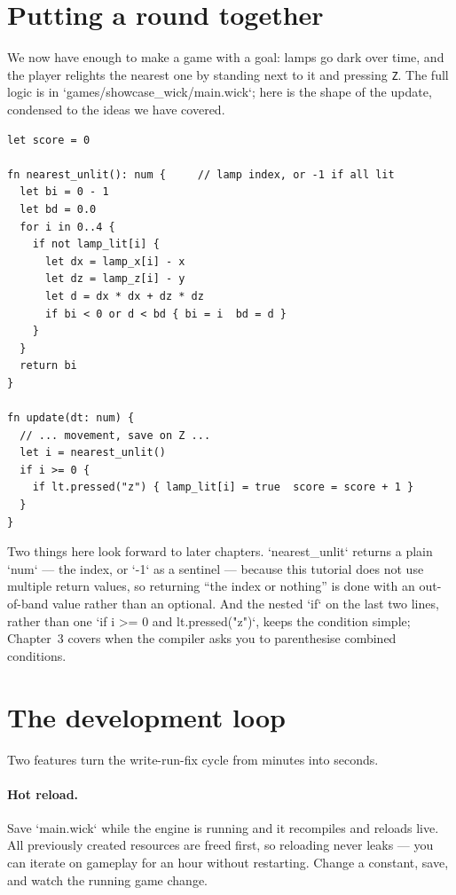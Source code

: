 \section{Putting a round together}

We now have enough to make a game with a goal: lamps go dark over time, and
the player relights the nearest one by standing next to it and pressing
\texttt{Z}. The full logic is in `games/showcase_wick/main.wick`; here is the
shape of the update, condensed to the ideas we have covered.

\begin{lstlisting}[language=wick]
let score = 0

fn nearest_unlit(): num {     // lamp index, or -1 if all lit
  let bi = 0 - 1
  let bd = 0.0
  for i in 0..4 {
    if not lamp_lit[i] {
      let dx = lamp_x[i] - x
      let dz = lamp_z[i] - y
      let d = dx * dx + dz * dz
      if bi < 0 or d < bd { bi = i  bd = d }
    }
  }
  return bi
}

fn update(dt: num) {
  // ... movement, save on Z ...
  let i = nearest_unlit()
  if i >= 0 {
    if lt.pressed("z") { lamp_lit[i] = true  score = score + 1 }
  }
}
\end{lstlisting}

\noindent
Two things here look forward to later chapters. `nearest_unlit` returns a
plain `num` --- the index, or `-1` as a sentinel --- because this tutorial does not use
multiple return values, so returning ``the index or nothing'' is done with an
out-of-band value rather than an optional. And the nested `if` on the last
two lines, rather than one `if i >= 0 and lt.pressed("z")`, keeps the
condition simple; Chapter~3 covers when the compiler asks you to parenthesise
combined conditions.

\section{The development loop}

Two features turn the write-run-fix cycle from minutes into seconds.

\paragraph{Hot reload.} Save `main.wick` while the engine is running and it
recompiles and reloads live. All previously created resources are freed
first, so reloading never leaks --- you can iterate on gameplay for an hour
without restarting. Change a constant, save, and watch the running game
change.

